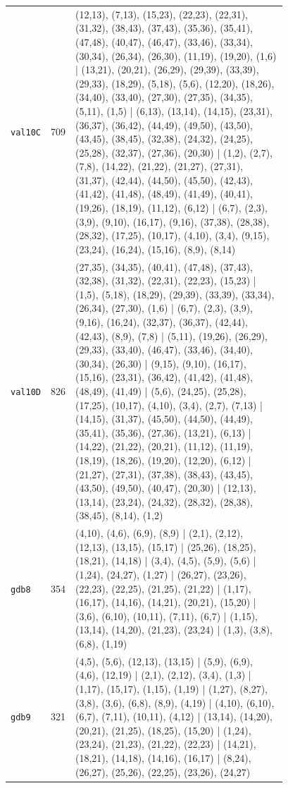 \begin{landscape}
\begin{longtable}{lr>{\tiny\raggedright\arraybackslash}p{0.78\linewidth}}
\texttt{val10C} & 709 & (12,13), (7,13), (15,23), (22,23), (22,31), (31,32), (38,43), (37,43), (35,36), (35,41), (47,48), (40,47), (46,47), (33,46), (33,34), (30,34), (26,34), (26,30), (11,19), (19,20), (1,6) | (13,21), (20,21), (26,29), (29,39), (33,39), (29,33), (18,29), (5,18), (5,6), (12,20), (18,26), (34,40), (33,40), (27,30), (27,35), (34,35), (5,11), (1,5) | (6,13), (13,14), (14,15), (23,31), (36,37), (36,42), (44,49), (49,50), (43,50), (43,45), (38,45), (32,38), (24,32), (24,25), (25,28), (32,37), (27,36), (20,30) | (1,2), (2,7), (7,8), (14,22), (21,22), (21,27), (27,31), (31,37), (42,44), (44,50), (45,50), (42,43), (41,42), (41,48), (48,49), (41,49), (40,41), (19,26), (18,19), (11,12), (6,12) | (6,7), (2,3), (3,9), (9,10), (16,17), (9,16), (37,38), (28,38), (28,32), (17,25), (10,17), (4,10), (3,4), (9,15), (23,24), (16,24), (15,16), (8,9), (8,14) \\[2pt]
\texttt{val10D} & 826 & (27,35), (34,35), (40,41), (47,48), (37,43), (32,38), (31,32), (22,31), (22,23), (15,23) | (1,5), (5,18), (18,29), (29,39), (33,39), (33,34), (26,34), (27,30), (1,6) | (6,7), (2,3), (3,9), (9,16), (16,24), (32,37), (36,37), (42,44), (42,43), (8,9), (7,8) | (5,11), (19,26), (26,29), (29,33), (33,40), (46,47), (33,46), (34,40), (30,34), (26,30) | (9,15), (9,10), (16,17), (15,16), (23,31), (36,42), (41,42), (41,48), (48,49), (41,49) | (5,6), (24,25), (25,28), (17,25), (10,17), (4,10), (3,4), (2,7), (7,13) | (14,15), (31,37), (45,50), (44,50), (44,49), (35,41), (35,36), (27,36), (13,21), (6,13) | (14,22), (21,22), (20,21), (11,12), (11,19), (18,19), (18,26), (19,20), (12,20), (6,12) | (21,27), (27,31), (37,38), (38,43), (43,45), (43,50), (49,50), (40,47), (20,30) | (12,13), (13,14), (23,24), (24,32), (28,32), (28,38), (38,45), (8,14), (1,2) \\[2pt]
\texttt{gdb8} & 354 & (4,10), (4,6), (6,9), (8,9) | (2,1), (2,12), (12,13), (13,15), (15,17) | (25,26), (18,25), (18,21), (14,18) | (3,4), (4,5), (5,9), (5,6) | (1,24), (24,27), (1,27) | (26,27), (23,26), (22,23), (22,25), (21,25), (21,22) | (1,17), (16,17), (14,16), (14,21), (20,21), (15,20) | (3,6), (6,10), (10,11), (7,11), (6,7) | (1,15), (13,14), (14,20), (21,23), (23,24) | (1,3), (3,8), (6,8), (1,19) \\[2pt]
\texttt{gdb9} & 321 & (4,5), (5,6), (12,13), (13,15) | (5,9), (6,9), (4,6), (12,19) | (2,1), (2,12), (3,4), (1,3) | (1,17), (15,17), (1,15), (1,19) | (1,27), (8,27), (3,8), (3,6), (6,8), (8,9), (4,19) | (4,10), (6,10), (6,7), (7,11), (10,11), (4,12) | (13,14), (14,20), (20,21), (21,25), (18,25), (15,20) | (1,24), (23,24), (21,23), (21,22), (22,23) | (14,21), (18,21), (14,18), (14,16), (16,17) | (8,24), (26,27), (25,26), (22,25), (23,26), (24,27) \\[2pt]

\end{longtable}
\end{landscape}
